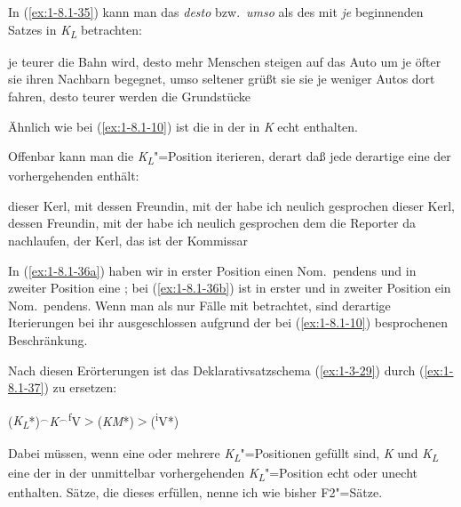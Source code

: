 \documentclass[output=paper]{langsci/langscibook}
\begin{document}
In (\ref{ex:1-8.1-35}) kann man das \textit{desto} bzw.\ \textit{umso} als  des mit \textit{je} beginnenden Satzes in \textit{K\textsubscript{L}} betrachten:
\begin{exe}
\ex\label{ex:1-8.1-35}
\begin{xlist}
\ex\label{ex:1-8.1-35a} je teurer die Bahn wird, desto mehr Menschen steigen auf das Auto um
\ex\label{ex:1-8.1-35b} je öfter sie ihren Nachbarn begegnet, umso seltener grüßt sie sie
\ex\label{ex:1-8.1-35c} je weniger Autos dort fahren, desto teurer werden die Grundstücke
\end{xlist}
\end{exe}
Ähnlich wie bei (\ref{ex:1-8.1-10}) ist die  in der  in \textit{K} echt enthalten.

Offenbar kann man die \textit{K\textsubscript{L}}"=Position iterieren, derart daß jede derartige  eine  der vorhergehenden enthält:
\begin{exe}
\ex\label{ex:1-8.1-36}
\begin{xlist}
\ex\label{ex:1-8.1-36a}  dieser Kerl, mit dessen Freundin, mit der habe ich neulich gesprochen
\ex\label{ex:1-8.1-36b} dieser Kerl, dessen Freundin, mit der habe ich neulich gesprochen
\ex\label{ex:1-8.1-36c} dem die Reporter da nachlaufen, der Kerl, das ist der Kommissar
\end{xlist}
\end{exe}
In (\ref{ex:1-8.1-36a}) haben wir in erster Position einen
Nom.\ pendens und in zweiter Position eine ; bei
(\ref{ex:1-8.1-36b}) ist in erster und in zweiter Position ein
Nom.\ pendens. Wenn man als  nur Fälle mit
  betrachtet, sind derartige Iterierungen bei
ihr ausgeschlossen aufgrund der bei (\ref{ex:1-8.1-10}) besprochenen
Beschränkung.

Nach diesen Erörterungen ist das Deklarativsatzschema (\ref{ex:1-3-29}) durch (\ref{ex:1-8.1-37}) zu ersetzen:
\begin{exe}
\ex\label{ex:1-8.1-37}
(\textit{K\textsubscript{L}}*)$^{\smallfrown}$\textit{K}$^{\smallfrown}$\textsuperscript{f}V$>$(\textit{KM}*)$>$(\textsuperscript{i}V*)
\end{exe}
Dabei müssen, wenn eine oder mehrere \textit{K\textsubscript{L}}"=Positionen gefüllt sind, \textit{K} und \textit{K\textsubscript{L}} eine
 der  in der unmittelbar vorhergehenden \textit{K\textsubscript{L}}"=Position echt oder
unecht enthalten. Sätze, die dieses  erfüllen, nenne ich wie bisher F2"=Sätze.
\end{document}
